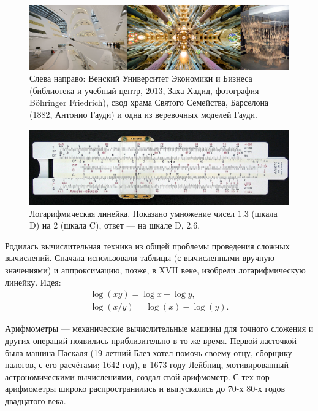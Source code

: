 \documentclass{book}
\begin{document}
\begin{figure}
	\includegraphics[width=1\linewidth]{arches.png}
    \caption{Слева направо: Венский Университет Экономики и Бизнеса (библиотека и учебный центр,
    2013, Заха Хадид, фотография Böhringer Friedrich), свод храма Святого Семейства, Барселона
    (1882, Антонио Гауди) и одна из веревочных моделей Гауди.}
\end{figure}
\begin{figure}
	\includegraphics[width=1\linewidth]{sliderule.png}
    \caption{Логарифмическая линейка. Показано умножение чисел $1.3$ (шкала D) на $2$ (шкала C),
    ответ --- на шкале D, $2.6$.}
\end{figure}

Родилась вычислительная техника из общей проблемы проведения сложных вычислений.
Сначала использовали таблицы (с вычисленными вручную значениями) и аппроксимацию, позже, в XVII
веке, изобрели логарифмическую линейку. Идея:
\begin{eqnarray}
    \log(xy) = \log x + \log y,\\
    \log(x / y) = \log(x) - \log(y).
\end{eqnarray}

Арифмометры --- механические вычислительные машины для точного сложения и других операций появились
приблизительно в то же время. Первой ласточкой была машина Паскаля (19 летний Блез хотел помочь
своему отцу, сборщику налогов, с его расчётами; 1642 год), в 1673 году Лейбниц, мотивированный
астрономическими вычислениями, создал свой арифмометр. С тех пор арифмометры широко
распространились и выпускались до 70-х 80-х годов двадцатого века.
\end{document}
